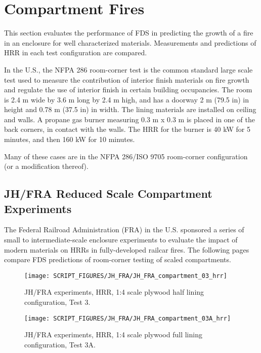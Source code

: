 \clearpage

\section{Compartment Fires}\label{sec_Compartment_Fires}

This section evaluates the performance of FDS in predicting the growth of a fire in an enclosure for well characterized materials.
Measurements and predictions of HRR in each test configuration are compared.

In the U.S., the NFPA 286 room-corner test is the common standard large scale test used to measure the contribution of interior finish materials on fire growth and regulate the use of interior finish in certain building occupancies.
The room is 2.4 m wide by 3.6 m long by 2.4 m high, and has a doorway 2 m (79.5 in) in height and 0.78 m (37.5 in) in width.
The lining materials are installed on ceiling and walls. A propane gas burner measuring 0.3 m x 0.3 m is placed in one of the back corners, in contact with the walls.
The HRR for the burner is 40 kW for 5 minutes, and then 160 kW for 10 minutes.

Many of these cases are in the NFPA 286/ISO 9705 room-corner configuration (or a modification thereof).

\subsection{JH/FRA Reduced Scale Compartment Experiments}\label{sec_JH_FRA_Scaled_Compartments}

The Federal Railroad Administration (FRA) in the U.S. sponsored a series of small to intermediate-scale enclosure experiments to evaluate the impact of modern materials on HRRs in fully-developed railcar fires.
The following pages compare FDS predictions of room-corner testing of scaled compartments.

\begin{figure}[h!]
\texttt{[image: SCRIPT\_FIGURES/JH\_FRA/JH\_FRA\_compartment\_03\_hrr]}
\caption[JH/FRA experiments, HRR, 1:4 scale plywood half lining configuration, Test 3]{JH/FRA experiments, HRR, 1:4 scale plywood half lining configuration, Test 3.}
\label{JH_FRA_plywood_01}
\end{figure}

\begin{figure}[h!]
\texttt{[image: SCRIPT\_FIGURES/JH\_FRA/JH\_FRA\_compartment\_03A\_hrr]}
\caption[JH/FRA experiments, HRR, 1:4 scale plywood full lining configuration, Test 3A]{JH/FRA experiments, HRR, 1:4 scale plywood full lining configuration, Test 3A.}
\label{JH_FRA_plywood_01A}
\end{figure}

